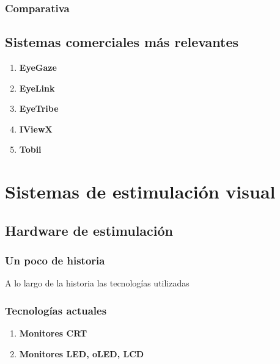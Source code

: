 \documentclass[../main.tex]{subfiles}
\begin{document}
			\subsubsection{Comparativa}
			\label{ssub:02_comparativa_eyetracker}
			
		\subsection{Sistemas comerciales más relevantes}
		\label{sub:02_sistemas_comerciales_más_relevantes}
			\begin{enumerate}
				\item \textbf{EyeGaze}

				\item \textbf{EyeLink}

				\item \textbf{EyeTribe}

				\item \textbf{IViewX}

				\item \textbf{Tobii}

			\end{enumerate}

	\section{Sistemas de estimulación visual}
	\label{sec:02_sistemas_de_estimulacion_visual}
		\subsection{Hardware de estimulación}
		\label{sub:02_hardware_de_estimulacion}
			\subsubsection{Un poco de historia} 
			\label{ssub:02_un_poco_de_historia_monitores}

			A lo largo de la historia las tecnologías utilizadas 

			\subsubsection{Tecnologías actuales} 
			\label{ssub:02_tecnologías_actuales}
				\begin{enumerate}
					\item \textbf{Monitores CRT}

					\item \textbf{Monitores LED, oLED, LCD}

				\end{enumerate}
\end{document}
